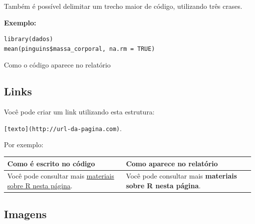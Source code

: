 \documentclass[
]{book}
\newenvironment{Shaded}{\begin{snugshade}}{\end{snugshade}}
\newcommand{\AttributeTok}[1]{\textcolor[rgb]{0.13,0.29,0.53}{#1}}
\newcommand{\ConstantTok}[1]{\textcolor[rgb]{0.56,0.35,0.01}{#1}}
\newcommand{\FunctionTok}[1]{\textcolor[rgb]{0.13,0.29,0.53}{\textbf{#1}}}
\newcommand{\NormalTok}[1]{#1}
\newcommand{\SpecialCharTok}[1]{\textcolor[rgb]{0.81,0.36,0.00}{\textbf{#1}}}
\begin{document}
Também é possível delimitar um trecho maior de código, utilizando três crases.

\textbf{Exemplo:}

\begin{verbatim}
library(dados)
mean(pinguins$massa_corporal, na.rm = TRUE)
\end{verbatim}

Como o código aparece no relatório

\begin{Shaded}
\end{Shaded}

\subsection{Links}\label{links}

Você pode criar um link utilizando esta estrutura:

\texttt{{[}texto{]}(http://url-da-pagina.com)}.

Por exemplo:

\begin{longtable}[]{@{}
  >{\raggedright\arraybackslash}p{}
  >{\raggedright\arraybackslash}p{}@{}}
\toprule\noalign{}
\begin{minipage}[b]{\linewidth}\raggedright
Como é escrito no código
\end{minipage} & \begin{minipage}[b]{\linewidth}\raggedright
Como aparece no relatório
\end{minipage} \\
\midrule\noalign{}
\endhead
\bottomrule\noalign{}
\endlastfoot
Você pode consultar mais \href{https://renatorpa.github.io/labestatistica1/relatórios.html}{materiais sobre R nesta página}. & Você pode consultar mais \textbf{materiais sobre R nesta página}. \\
\end{longtable}

\subsection{Imagens}\label{imagens}
\end{document}
